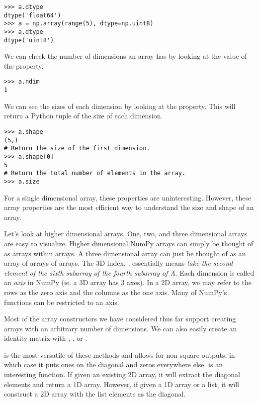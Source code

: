 \begin{lstlisting}
>>> a.dtype
dtype('float64')
>>> a = np.array(range(5), dtype=np.uint8) 
>>> a.dtype
dtype('uint8') 
\end{lstlisting} 

We can check the number of dimensions an
array has by looking at the value of the  property. 
\begin{lstlisting}
>>> a.ndim
1 
\end{lstlisting} 

We can see the sizes of each dimension by looking at
the  property. This will return a Python tuple of the size of
each dimension. 
\begin{lstlisting}
>>> a.shape
(5,)
# Return the size of the first dimension.
>>> a.shape[0]
5 
# Return the total number of elements in the array.
>>> a.size 
\end{lstlisting} 

For a single dimensional array, these properties are
uninteresting. However, these array properties are the most efficient way 
to understand the size and shape of an array.

Let's look at higher dimensional arrays. One, two, and three dimensional
arrays are easy to visualize. Higher dimensional NumPy arrays can simply be
thought of as arrays within arrays. A three dimensional array can just
be thought of as an array of arrays of arrays. The 3D index, , essentially means \emph{take the second element}  \emph{of the sixth
subarray}  \emph{of the fourth subarray}  \emph{of A}. 
 Each dimension is called an \emph{axis} in NumPy (ie. a 3D array has 3 axes).  
In a 2D array, we may refer to the rows as the zero axis and the columns as the
one axis. Many of NumPy's functions can be restricted to an axis. 

Most of the array constructors we have considered thus far support 
creating arrays with an arbitrary number of dimensions. 
We can also easily create an identity matrix with , ,
 or . 
 
 is the most versatile of these methods and allows for non-square outputs, 
in which case it puts ones on the diagonal and zeros everywhere else. 
 is an interesting function.  If given an existing 2D array, 
it will extract the diagonal elements and return a 1D array. However, if given 
a 1D array or a list, it will construct a 2D array with the list elements as the diagonal.

